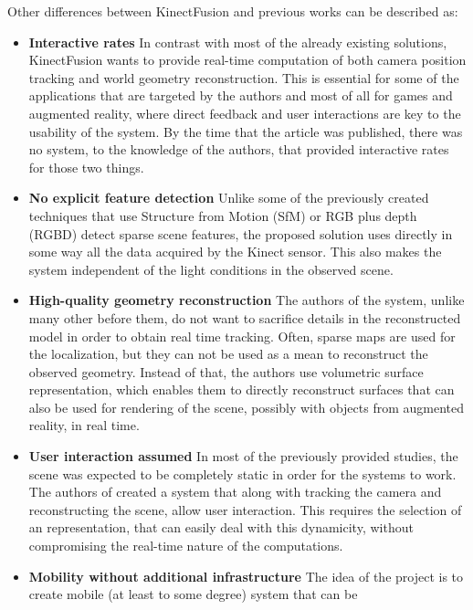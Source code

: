 \documentclass[12pt]{article}
\theoremstyle{plain}
\begin{document}
  Other differences between KinectFusion and previous works can be described as:
  \begin{itemize}
    \item \textbf{Interactive rates} In contrast with most of the already
      existing solutions, KinectFusion wants to provide real-time computation of
      both camera position tracking and world geometry reconstruction. This is
      essential for some of the applications that are targeted by the authors
      and most of all for games and augmented reality, where direct feedback and
      user interactions are key to the usability of the system. By the time that
      the article was published, there was no system, to the knowledge of the
      authors, that provided interactive rates for those two things.
    \item \textbf{No explicit feature detection} Unlike some of the previously
      created techniques that use Structure from Motion (SfM) or RGB plus depth
      (RGBD) detect sparse scene features, the proposed solution uses directly
      in some way all the data acquired by the Kinect sensor. This also makes
      the system independent of the light conditions in the observed scene.
    \item \textbf{High-quality geometry reconstruction} The authors of the
      system, unlike many other before them, do not want to sacrifice details in
      the reconstructed model in order to obtain real time tracking. Often,
      sparse maps are used for the localization, but they can not be used as a
      mean to reconstruct the observed geometry. Instead of that, the authors
      use volumetric surface representation, which enables them to directly
      reconstruct surfaces that can also be used for rendering of the scene,
      possibly with objects from augmented reality, in real time.
    \item \textbf{User interaction assumed} In most of the previously provided
      studies, the scene was expected to be completely static in order for the
      systems to work. The authors of \cite{kinectfusion} created a system that
      along with tracking the camera and reconstructing the scene, allow user
      interaction. This requires the selection of an representation, that can
      easily deal with this dynamicity, without compromising the real-time
      nature of the computations.
    \item \textbf{Mobility without additional infrastructure} The idea of the
      project is to create mobile (at least to some degree) system that can be

\end{itemize}
\end{document}
